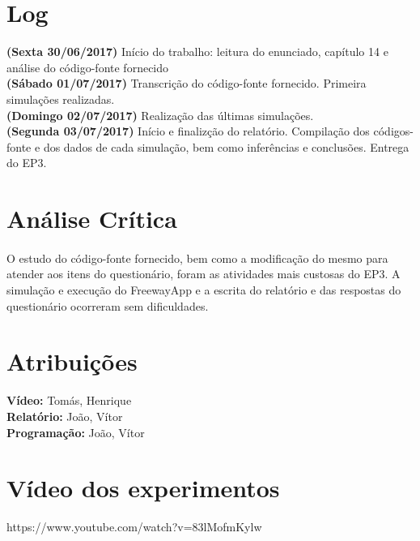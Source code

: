 \documentclass{article}
\begin{document}
\section{Log}
\textbf{(Sexta 30/06/2017)} Início do trabalho: leitura do enunciado, capítulo 14 e análise do código-fonte fornecido \\
\textbf{(Sábado 01/07/2017)} Transcrição do código-fonte fornecido. Primeira simulações realizadas. \\
\textbf{(Domingo  02/07/2017)} Realização das últimas simulações. \\
\textbf{(Segunda  03/07/2017)} Início e finalizção do relatório. Compilação dos códigos-fonte e dos dados de cada simulação, bem como inferências e conclusões. Entrega do EP3. \\

\section{Análise Crítica}
\paragraph{}O estudo do código-fonte fornecido, bem como a modificação do mesmo para atender aos itens do questionário, foram as atividades mais custosas do EP3. A simulação e execução do FreewayApp e a escrita do relatório e das respostas do questionário ocorreram sem dificuldades.


\section{Atribuições}
\textbf{Vídeo:} Tomás, Henrique \\
\textbf{Relatório:} João, Vítor \\
\textbf{Programação:} João, Vítor

\section{Vídeo dos experimentos}

https://www.youtube.com/watch?v=83lMofmKylw
\end{document}

